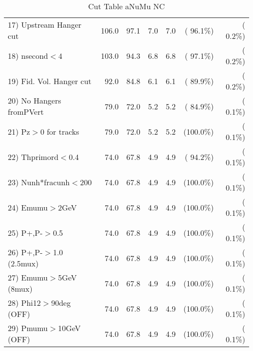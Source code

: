 \begin{table}[h!]
\begin{tabular}{||l||r|r|r|r|r|r||}
 17) Upstream Hanger cut  &        106.0 &         97.1 &          7.0 &          7.0 & ( 96.1\%) & (  0.2\%) \\
 18) nsecond$<$4          &        103.0 &         94.3 &          6.8 &          6.8 & ( 97.1\%) & (  0.2\%) \\
 19) Fid. Vol. Hanger cut &         92.0 &         84.8 &          6.1 &          6.1 & ( 89.9\%) & (  0.2\%) \\
 20) No Hangers fromPVert &         79.0 &         72.0 &          5.2 &          5.2 & ( 84.9\%) & (  0.1\%) \\
 21) Pz$>$0 for tracks    &         79.0 &         72.0 &          5.2 &          5.2 & (100.0\%) & (  0.1\%) \\
 22) Thprimord$<$0.4      &         74.0 &         67.8 &          4.9 &          4.9 & ( 94.2\%) & (  0.1\%) \\
 23) Nunh*fracunh$<$200   &         74.0 &         67.8 &          4.9 &          4.9 & (100.0\%) & (  0.1\%) \\
 24) Emumu$>$2GeV         &         74.0 &         67.8 &          4.9 &          4.9 & (100.0\%) & (  0.1\%) \\
 25) P+,P-$>$0.5          &         74.0 &         67.8 &          4.9 &          4.9 & (100.0\%) & (  0.1\%) \\
 26) P+,P-$>$1.0 (2.5mux) &         74.0 &         67.8 &          4.9 &          4.9 & (100.0\%) & (  0.1\%) \\
 27) Emumu$>$5GeV  (8mux) &         74.0 &         67.8 &          4.9 &          4.9 & (100.0\%) & (  0.1\%) \\
 28) Phi12$>$90deg  (OFF) &         74.0 &         67.8 &          4.9 &          4.9 & (100.0\%) & (  0.1\%) \\
 29) Pmumu$>$10GeV  (OFF) &         74.0 &         67.8 &          4.9 &          4.9 & (100.0\%) & (  0.1\%) \\
 \hline
 \hline
 \end{tabular}
 \caption{Cut Table  aNuMu NC }
 \label{tab-cutcohjpsi-mumu_anumunc}
 \end{table}
